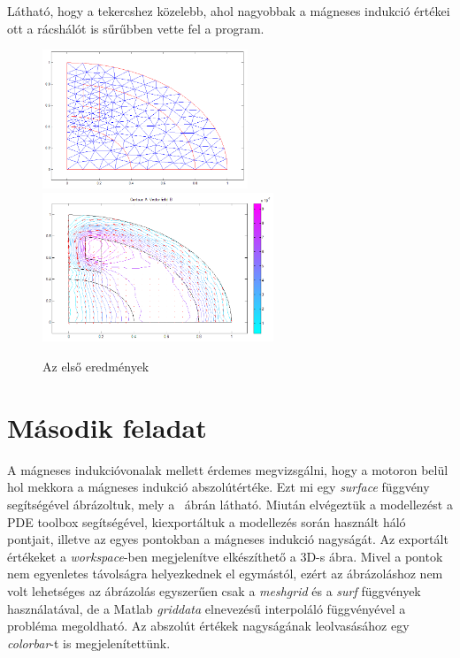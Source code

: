 Látható, hogy a tekercshez közelebb, ahol nagyobbak a mágneses indukció értékei ott a rácshálót is sűrűbben vette fel a program.
 \begin{figure}[!h]
	\centering
	\includegraphics[width=61.5mm, keepaspectratio]{figures/terek/nl_1_init_mesh.png}\hspace{5mm}
	\includegraphics[width=69mm, keepaspectratio]{figures/terek/nl_1_init.png}
	\caption{Az első eredmények}
	\label{fig:calib}
\end{figure}


\section{Második feladat}

A mágneses indukcióvonalak mellett érdemes megvizsgálni, hogy a motoron belül hol mekkora a mágneses indukció abszolútértéke. Ezt mi egy \textit{surface} függvény segítségével ábrázoltuk, mely a ~ábrán látható. Miután elvégeztük a modellezést a PDE toolbox segítségével, kiexportáltuk a modellezés során használt háló pontjait, illetve az egyes pontokban a mágneses indukció nagyságát. Az exportált értékeket a \textit{workspace}-ben megjelenítve elkészíthető a 3D-s ábra. Mivel a pontok nem egyenletes távolságra helyezkednek el egymástól, ezért az ábrázoláshoz nem volt lehetséges az ábrázolás egyszerűen csak a \textit{meshgrid} és a \textit{surf} függvények használatával, de a Matlab \textit{griddata} elnevezésű interpoláló függvényével a probléma megoldható. Az abszolút értékek nagyságának leolvasásához egy \textit{colorbar}-t is megjelenítettünk.

